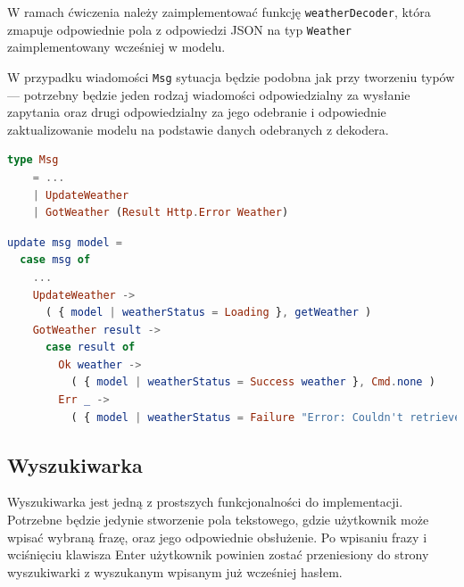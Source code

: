 \documentclass[twoside,a4paper]{report}
\begin{document}
W ramach ćwiczenia należy zaimplementować funkcję \texttt{weatherDecoder}, która zmapuje odpowiednie pola z odpowiedzi JSON na typ \texttt{Weather} zaimplementowany wcześniej w modelu.

W przypadku wiadomości \texttt{Msg} sytuacja będzie podobna jak przy tworzeniu typów --- potrzebny będzie jeden rodzaj wiadomości odpowiedzialny za wysłanie zapytania oraz drugi odpowiedzialny za jego odebranie i odpowiednie zaktualizowanie modelu na podstawie danych odebranych z dekodera.

\begin{lstlisting}[language=Elm]
type Msg
    = ...
    | UpdateWeather
    | GotWeather (Result Http.Error Weather)
\end{lstlisting}

\begin{lstlisting}[language=Elm]
update msg model =
  case msg of
    ...
    UpdateWeather ->
      ( { model | weatherStatus = Loading }, getWeather )
    GotWeather result ->
      case result of
        Ok weather ->
          ( { model | weatherStatus = Success weather }, Cmd.none )
        Err _ ->
          ( { model | weatherStatus = Failure "Error: Couldn't retrieve weather data" }, Cmd.none)
\end{lstlisting}


\subsection{Wyszukiwarka}
Wyszukiwarka jest jedną z prostszych funkcjonalności do implementacji.
Potrzebne będzie jedynie stworzenie pola tekstowego, gdzie użytkownik może wpisać wybraną frazę, oraz jego odpowiednie obsłużenie.
Po wpisaniu frazy i wciśnięciu klawisza Enter użytkownik powinien zostać przeniesiony do strony wyszukiwarki z wyszukanym wpisanym już wcześniej hasłem.
\end{document}
